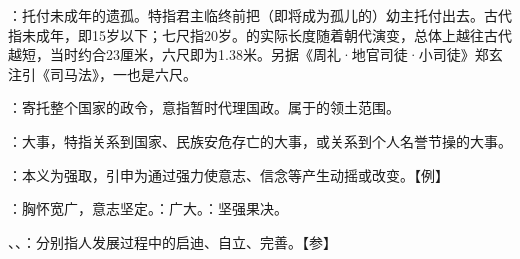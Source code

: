 {
\item {}：托付未成年的遗孤。特指君主临终前把（即将成为孤儿的）幼主托付出去。古代指未成年，即15岁以下；七尺指20岁。的实际长度随着朝代演变，总体上越往古代越短，当时约合23厘米，六尺即为1.38米。另据《周礼·地官司徒·小司徒》郑玄注引《司马法》，一也是六尺。
\item {}：寄托整个国家的政令，意指暂时代理国政。属于的领土范围。

\item {}：大事，特指关系到国家、民族安危存亡的大事，或关系到个人名誉节操的大事。
\item {}：本义为强取，引申为通过强力使意志、信念等产生动摇或改变。【例】 
}
{}


{
\item {}：胸怀宽广，意志坚定。：广大。：坚强果决。
}
{}


{
\item {}、、：分别指人发展过程中的启迪、自立、完善。【参】
}
{}


